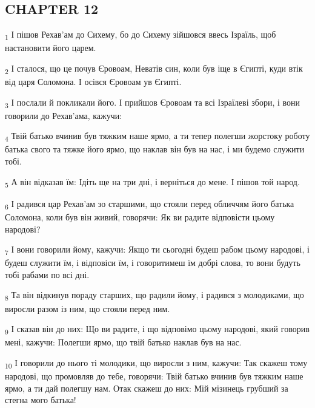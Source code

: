\subsection{CHAPTER 12}
\begin{tcolorbox}
\textsubscript{1} І пішов Рехав'ам до Сихему, бо до Сихему зійшовся ввесь Ізраїль, щоб настановити його царем.
\end{tcolorbox}
\begin{tcolorbox}
\textsubscript{2} І сталося, що це почув Єровоам, Неватів син, коли був іще в Єгипті, куди втік від царя Соломона. І осівся Єровоам ув Єгипті.
\end{tcolorbox}
\begin{tcolorbox}
\textsubscript{3} І послали й покликали його. І прийшов Єровоам та всі Ізраїлеві збори, і вони говорили до Рехав'ама, кажучи:
\end{tcolorbox}
\begin{tcolorbox}
\textsubscript{4} Твій батько вчинив був тяжким наше ярмо, а ти тепер полегши жорстоку роботу батька свого та тяжке його ярмо, що наклав він був на нас, і ми будемо служити тобі.
\end{tcolorbox}
\begin{tcolorbox}
\textsubscript{5} А він відказав їм: Ідіть ще на три дні, і верніться до мене. І пішов той народ.
\end{tcolorbox}
\begin{tcolorbox}
\textsubscript{6} І радився цар Рехав'ам зо старшими, що стояли перед обличчям його батька Соломона, коли був він живий, говорячи: Як ви радите відповісти цьому народові?
\end{tcolorbox}
\begin{tcolorbox}
\textsubscript{7} І вони говорили йому, кажучи: Якщо ти сьогодні будеш рабом цьому народові, і будеш служити їм, і відповіси їм, і говоритимеш їм добрі слова, то вони будуть тобі рабами по всі дні.
\end{tcolorbox}
\begin{tcolorbox}
\textsubscript{8} Та він відкинув пораду старших, що радили йому, і радився з молодиками, що виросли разом із ним, що стояли перед ним.
\end{tcolorbox}
\begin{tcolorbox}
\textsubscript{9} І сказав він до них: Що ви радите, і що відповімо цьому народові, який говорив мені, кажучи: Полегши ярмо, що твій батько наклав був на нас.
\end{tcolorbox}
\begin{tcolorbox}
\textsubscript{10} І говорили до нього ті молодики, що виросли з ним, кажучи: Так скажеш тому народові, що промовляв до тебе, говорячи: Твій батько вчинив був тяжким наше ярмо, а ти дай полегшу нам. Отак скажеш до них: Мій мізинець грубший за стегна мого батька!
\end{tcolorbox}
